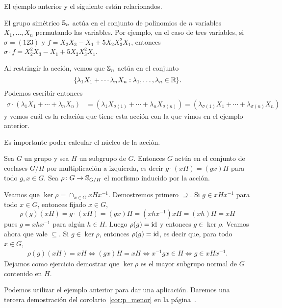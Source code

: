El ejemplo anterior y el siguiente están relacionados.

\begin{example}
    El grupo simétrico $\mathbb{S}_n$ actúa en el conjunto de polinomios de $n$ variables $X_1,\dots,X_n$
    permutando las variables. Por ejemplo, en el caso de tres variables, si 
    $\sigma=(123)$ y $f=X_2X_3-X_1+5X_2X_3^2X_1$, entonces
    $\sigma\cdot f=X_2^2X_3-X_1+5X_2X_3^2X_1$. 
    
    Al restringir la acción, vemos que 
    $\mathbb{S}_n$ actúa en el conjunto 
    \[
    \{\lambda_1X_1+\cdots\lambda_nX_n:\lambda_1,\dots,\lambda_n\in\mathbb{R}\}.
    \]
    Podemos escribir entonces
    \begin{align*}
    \sigma \cdot (\lambda_1X_1+\cdots+\lambda_nX_n) &= (\lambda_1X_{\sigma(1)}+\cdots+\lambda_nX_{\sigma(n)})
    =(\lambda_{\sigma(1)}X_1+\cdots+\lambda_{\sigma(n)}X_n)
    \end{align*}
    y vemos cuál es la relación que tiene esta acción con la que vimos en el ejemplo anterior.
\end{example}

Es importante poder calcular el núcleo de la acción. 

\begin{example}
Sea $G$ un grupo y sea $H$ un subgrupo de $G$. Entonces $G$ actúa en el conjunto de coclases $G/H$ por multiplicación a izquierda, es decir
$g\cdot (xH)=(gx)H$ para todo $g,x\in G$. Sea $\rho\colon G\to\mathbb{S}_{G/H}$ el morfismo inducido por la acción.

 Veamos que $\ker\rho=\cap_{x\in G}xHx^{-1}$. Demostremos primero $\supseteq$. Si $g\in xHx^{-1}$ para todo $x\in G$, entonces
 fijado $x\in G$, 
 \[
 \rho(g)(xH)=g\cdot (xH)=(gx)H=(xhx^{-1})xH=(xh)H=xH
 \]
 pues $g=xhx^{-1}$ para algún $h\in H$. Luego $\rho(g)=\operatorname{id}$ y entonces $g\in\ker\rho$. Veamos ahora que vale $\subseteq$. Si $g\in\ker\rho$, entonces
 $\rho(g)=\operatorname{id}$, es decir que, para todo $x\in G$,  
 \begin{align*}
\rho(g)(xH)=xH
\Longleftrightarrow (gx)H=xH
\Longleftrightarrow x^{-1}gx\in H
\Longleftrightarrow g\in xHx^{-1}.
 \end{align*}
Dejamos como 
ejercicio demostrar que $\ker\rho$ es el mayor subgrupo normal de $G$ contenido en $H$. 
\end{example}

Podemos utilizar el ejemplo anterior para dar una aplicación. Daremos una tercera demostración 
del corolario~\ref{cor:p_menor} en la página~\pageref{cor:p_menor}.

